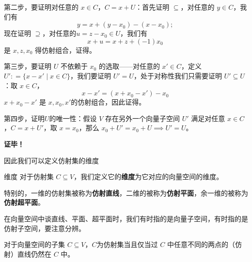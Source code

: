 第二步，要证明对任意的 $x \in C$，$C = x + U$：首先证明 $\subseteq$，对任意的 $y \in C$，我们有
\begin{equation}
y = x + (y - x_0) - (x - x_0); ~
\end{equation}
现在证明 $\supseteq$，对任意的$u  = z - x_0 \in U$，我们有
\begin{equation}
x + u = x + z + (-1) x_0 ~
\end{equation}
是 $x, z, x_0$ 得仿射组合，证得。

第三步，要证明 $U$ 不依赖于 $x_0$ 的选取——对任意的 $x' \in C$，定义 $U': = \{x - x' \mid x \in C\}$，我们要证明 $U' = U$，处于对称性我们只需要证明 $U' \subseteq U$：取 $x \in C$，
\begin{equation}
x - x' = (x + x_0 - x') - x_0 ~
\end{equation}
$x + x_0 - x'$ 是 $x, x_0, x'$的仿射组合，因此证得。

第四步，证明$U$的唯一性：假设 $V$ 存在另外一个向量子空间 $U'$ 满足对任意 $x \in C$，$C = x + U'$，取 $x = x_0$，那么 $x_0 + U' = x_0 + U \implies U' = U$。

\textbf{证毕！}

因此我们可以定义仿射集的维度
\begin{definition}{维度}
对于仿射集 $C \subseteq V$，我们定义它的\textbf{维度}为它对应的向量空间的维度。

特别的，一维的仿射集被称为\textbf{仿射直线}，二维的被称为\textbf{仿射平面}，余一维的被称为\textbf{仿射超平面}。
\end{definition}

在向量空间中谈直线、平面、超平面时，我们有时指的是向量子空间，有时指的是仿射子空间，要注意分辨。

\begin{theorem}{}
对于向量空间的子集 $C \subseteq V$，$C$为仿射集当且仅当过 $C$ 中任意不同的两点的（仿射）直线仍然在 $C$ 中。
\end{theorem}



